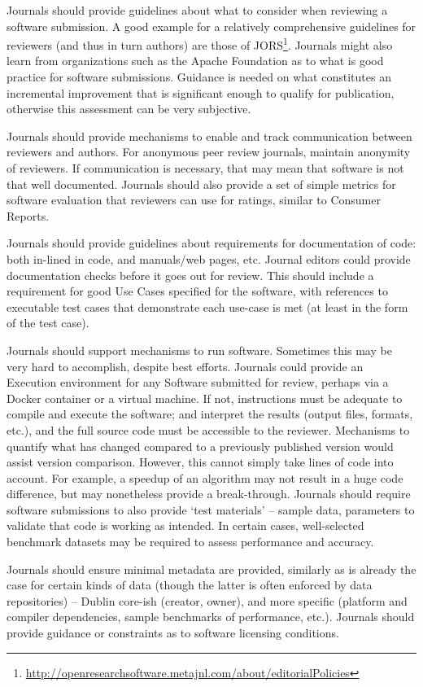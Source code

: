 \documentclass[11pt, oneside]{amsart}
\begin{document}
Journals should provide guidelines about what to consider when reviewing a software submission. A good example for a relatively comprehensive guidelines for reviewers (and thus in turn authors) are those of JORS\footnote{\url{http://openresearchsoftware.metajnl.com/about/editorialPolicies}}. Journals might also learn from organizations such as the Apache Foundation as to what is good practice for software submissions. Guidance is needed on what constitutes an incremental improvement that is significant enough to qualify for publication, otherwise this assessment can be very subjective.

Journals should provide mechanisms to enable and track communication between reviewers and authors. For anonymous peer review journals, maintain anonymity of reviewers. If communication is necessary, that may mean that software is not that well documented. Journals should also provide a set of simple metrics for software evaluation that reviewers can use for ratings, similar to Consumer Reports.

Journals should provide guidelines about requirements for documentation of code: both in-lined in code, and manuals/web pages, etc. Journal editors could provide documentation checks before it goes out for review.  This should include a requirement for good Use Cases specified for the software, with references to executable test cases that demonstrate each use-case is met (at least in the form of the test case).

Journals should support mechanisms to run software. Sometimes this may be very hard to accomplish, despite best efforts. Journals could provide an Execution environment for any Software submitted for review, perhaps via a Docker container or a virtual machine. If not, instructions must be adequate to compile and execute the software; and interpret the results (output files, formats, etc.), and the full source code must be accessible to the reviewer. Mechanisms to quantify what has changed compared to a previously published version would assist version comparison. However, this cannot simply take lines of code into account. For example, a speedup of an algorithm may not result in a huge code difference, but may nonetheless provide a break-through. Journals should require software submissions to also provide `test materials' -- sample data, parameters to validate that code is working as intended. In certain cases, well-selected benchmark datasets may be required to assess performance and accuracy.

Journals should ensure minimal metadata are provided, similarly as is already the case for certain kinds of data (though the latter is often enforced by data repositories) -- Dublin core-ish (creator, owner), and more specific (platform and compiler dependencies, sample benchmarks of performance, etc.). Journals should provide guidance or constraints as to software licensing conditions.
\end{document}
